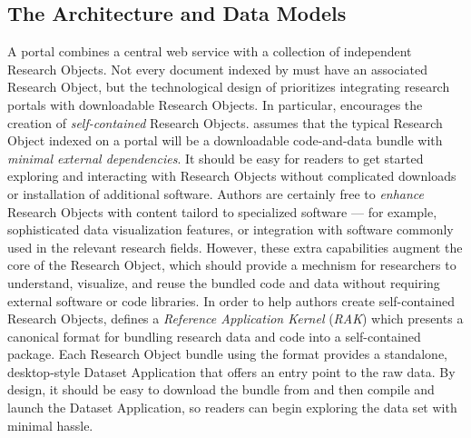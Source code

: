 \documentclass[10pt,letterpaper]{article}
\begin{document}
\subsection{The {\lMOSAIC} Architecture and Data Models}
A {\MOSAIC} portal combines a central web service with a 
collection of independent Research Objects.  Not every 
document indexed by {\MOSAIC} must have an associated 
Research Object, but the technological design of 
{\MOSAIC} prioritizes integrating research portals 
with downloadable Research Objects.
\p{}
In particular, {\MOSAIC} encourages the 
creation of \textit{self-contained} Research Objects.  
{\MOSAIC} assumes that the 
typical Research Object indexed on a {\MOSAIC} portal 
will be a downloadable code-and-data bundle 
with \textit{minimal external dependencies}.  
It should be easy for readers to get 
started exploring and interacting with Research Objects 
without complicated downloads or installation of 
additional software.  Authors are certainly free 
to \textit{enhance} Research Objects with 
content tailord to specialized software --- for 
example, sophisticated data visualization features, 
or integration with software commonly used in the 
relevant research fields.  However, these extra capabilities 
augment the core of the Research Object, which should 
provide a mechnism for researchers to understand, 
visualize, and reuse the bundled code and data without 
requiring external software or code libraries.
\p{}
In order to help authors create self-contained 
Research Objects, {\MOSAIC} defines a 
\textit{Reference Application Kernel} (\textit{RAK}) 
which presents a canonical format for bundling 
research data and code into a self-contained 
package.   
Each Research Object bundle using 
the {\RAK} format provides a standalone, desktop-style 
Dataset Application that offers an entry point to 
the raw data.  By design, it should be easy 
to download the {\RAK} bundle from {\MOSAIC} and 
then compile and launch the Dataset Application, so 
readers can begin exploring the data set with 
minimal hassle.  
\end{document}
